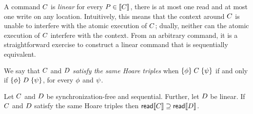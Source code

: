 A command $C$ is \emph{linear} for every $P\in\llbracket C\rrbracket$, there is
at most one read and at most one write on any location.  Intuitively, this
means that the context around $C$ is unable to interfere with the atomic
execution of $C$; dually, neither can the atomic execution of $C$
interfere with the context.  From an arbitrary command, it is a
straightforward exercise to construct a linear command that is sequentially
equivalent.

We say that $C$ and $D$ \emph{satisfy the same Hoare triples} when
$\{\phi\}\allowbreak\;C\;\allowbreak\{\psi\}$ if and only if
$\{\phi\}\allowbreak\;D\;\allowbreak\{\psi\}$, for every $\phi$ and $\psi$.

\begin{corollary}\label{seqcompleteness}
  Let $C$ and $D$ be synchronization-free and sequential.  Further,
  let $D$ be linear.  If $C$ and $D$ satisfy the same Hoare
  triples then $\mathsf{read}\llbracket C\rrbracket \supseteq \mathsf{read}\llbracket D\rrbracket$.
%    
\end{corollary}



